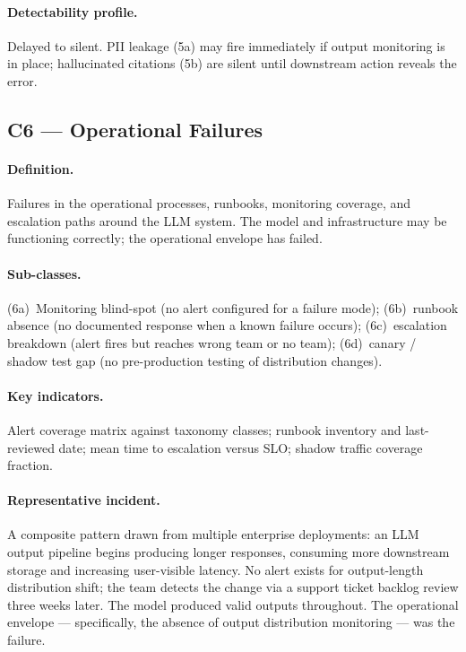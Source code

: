 \documentclass{article}
\begin{document}
\paragraph{Detectability profile.}
Delayed to silent.  PII leakage (5a) may fire immediately if output monitoring
is in place; hallucinated citations (5b) are silent until downstream action
reveals the error.

\subsection{C6 --- Operational Failures}

\paragraph{Definition.}
Failures in the operational processes, runbooks, monitoring coverage, and
escalation paths around the LLM system.  The model and infrastructure may be
functioning correctly; the operational envelope has failed.

\paragraph{Sub-classes.}
(6a)~Monitoring blind-spot (no alert configured for a failure mode);
(6b)~runbook absence (no documented response when a known failure occurs);
(6c)~escalation breakdown (alert fires but reaches wrong team or no team);
(6d)~canary / shadow test gap (no pre-production testing of distribution
changes).

\paragraph{Key indicators.}
Alert coverage matrix against taxonomy classes; runbook inventory and
last-reviewed date; mean time to escalation versus SLO; shadow traffic
coverage fraction.

\paragraph{Representative incident.}
A composite pattern drawn from multiple enterprise deployments: an LLM output
pipeline begins producing longer responses, consuming more downstream storage
and increasing user-visible latency.  No alert exists for output-length
distribution shift; the team detects the change via a support ticket backlog
review three weeks later.  The model produced valid outputs throughout.
The operational envelope --- specifically, the absence of output distribution
monitoring --- was the failure.
\end{document}
